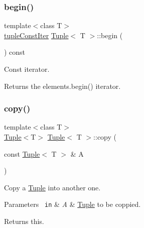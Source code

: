 \subsubsection{\texorpdfstring{begin()}{begin()}\hspace{0.1cm}{\footnotesize\ttfamily [2/2]}}
{\footnotesize\ttfamily template$<$class T$>$ \\
\mbox{\hyperlink{maths_8hh_a2eba794860251c1b30e532df32ee4d1b}{tuple\+Const\+Iter}} \mbox{\hyperlink{class_tuple}{Tuple}}$<$ T $>$\+::begin (\begin{DoxyParamCaption}{ }\end{DoxyParamCaption}) const\hspace{0.3cm}{\ttfamily [inline]}}



Const iterator. 

\begin{DoxyReturn}{Returns}
the elements.\+begin() iterator. 
\end{DoxyReturn}
\mbox{\label{class_tuple_ac4b525e02b40a646ebd4f600fe78d00f}} 
\subsubsection{\texorpdfstring{copy()}{copy()}}
{\footnotesize\ttfamily template$<$class T$>$ \\
\mbox{\hyperlink{class_tuple}{Tuple}}$<$T$>$ \mbox{\hyperlink{class_tuple}{Tuple}}$<$ T $>$\+::copy (\begin{DoxyParamCaption}\item[{const \mbox{\hyperlink{class_tuple}{Tuple}}$<$ T $>$ \&}]{A }\end{DoxyParamCaption})\hspace{0.3cm}{\ttfamily [inline]}}



Copy a \mbox{\hyperlink{class_tuple}{Tuple}} into another one. 


\begin{DoxyParams}[1]{Parameters}
\mbox{\texttt{ in}}  & {\em A} & \mbox{\hyperlink{class_tuple}{Tuple}} to be coppied. \\
\hline
\end{DoxyParams}
\begin{DoxyReturn}{Returns}
this. 
\end{DoxyReturn}
\mbox{\label{class_tuple_af47521571361439c96392dee70a79cc7}} 
